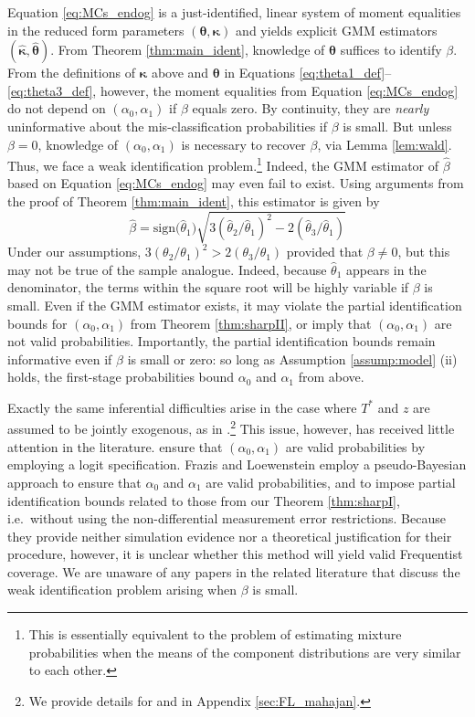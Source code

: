 Equation \ref{eq:MCs_endog} is a just-identified, linear system of moment equalities in the reduced form parameters $(\boldsymbol{\theta},\boldsymbol{\kappa})$ and yields explicit GMM estimators $(\widehat{\boldsymbol{\kappa}},\widehat{\boldsymbol{\theta}})$.
From Theorem \ref{thm:main_ident}, knowledge of $\boldsymbol{\theta}$ suffices to identify $\beta$.
From the definitions of $\boldsymbol{\kappa}$ above and $\boldsymbol{\theta}$  in Equations \ref{eq:theta1_def}--\ref{eq:theta3_def}, however, the moment equalities from Equation \ref{eq:MCs_endog} do not depend on $(\alpha_0, \alpha_1)$ if $\beta$ equals zero.
By continuity, they are \emph{nearly} uninformative about the mis-classification probabilities if $\beta$ is small.
But unless $\beta = 0$, knowledge of $(\alpha_0, \alpha_1)$ is necessary to recover $\beta$, via Lemma \ref{lem:wald}. 
Thus, we face a weak identification problem.\footnote{This is essentially equivalent to the problem of estimating mixture probabilities when the means of the component distributions are very similar to each other.}
Indeed, the GMM estimator of $\widehat{\beta}$ based on Equation \ref{eq:MCs_endog} may even fail to exist.
Using arguments from the proof of Theorem \ref{thm:main_ident}, this estimator is given by 
\[
  \widehat{\beta} = \mbox{sign}\big(\widehat{\theta}_1\big) \sqrt{3\left( \widehat{\theta}_2/\widehat{\theta}_1 \right)^2 - 2 \left(\widehat{\theta}_3/\widehat{\theta}_1 \right)}
\]
Under our assumptions, $3(\theta_2/\theta_1)^2 > 2 (\theta_3/\theta_1)$ provided that $\beta \neq 0$, but this may not be true of the sample analogue.
Indeed, because $\widehat{\theta}_1$ appears in the denominator, the terms within the square root will be highly variable if $\beta$ is small.
Even if the GMM estimator exists, it may violate the partial identification bounds for $(\alpha_0, \alpha_1)$ from Theorem \ref{thm:sharpII}, or imply that $(\alpha_0,\alpha_1)$ are not valid probabilities. 
Importantly, the partial identification bounds remain informative even if $\beta$ is small or zero: so long as Assumption \ref{assump:model} (ii) holds, the first-stage probabilities bound $\alpha_0$ and $\alpha_1$ from above.


Exactly the same inferential difficulties arise in the case where $T^*$ and $z$ are assumed to be jointly exogenous, as in \cite{KRS,BBS,FL,Mahajan,Lewbel}.\footnote{We provide details for \cite{FL} and \cite{Mahajan} in Appendix \ref{sec:FL_mahajan}.}
This issue, however, has received little attention in the literature. 
\cite{KRS} ensure that $(\alpha_0, \alpha_1)$ are valid probabilities by employing a logit specification.
Frazis and Loewenstein employ a pseudo-Bayesian approach to ensure that $\alpha_0$ and $\alpha_1$ are valid probabilities, and to impose partial identification bounds related to those from our Theorem \ref{thm:sharpI}, i.e.\ without using the non-differential measurement error restrictions.
Because they provide neither simulation evidence nor a theoretical justification for their procedure, however, it is unclear whether this method will yield valid Frequentist coverage.
We are unaware of any papers in the related literature that discuss the weak identification problem arising when $\beta$ is small.


